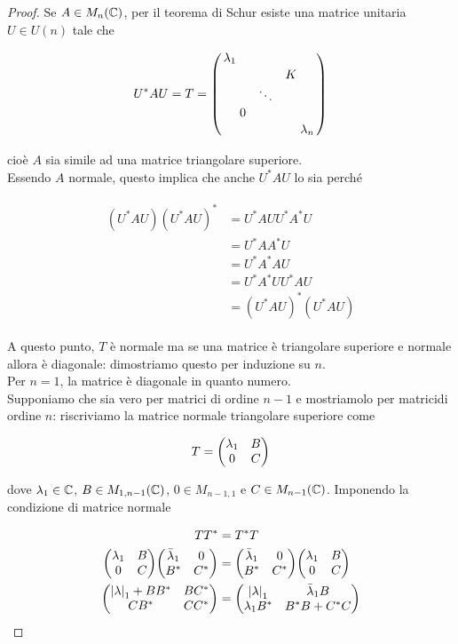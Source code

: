 \begin{proof}
	Se $ A \in M_{n}(\mathbb{C}) $, per il teorema di Schur esiste una matrice unitaria $ U \in U(n) $ tale che
	
	\begin{equation}
		U^{*} A U = T = %
		\smqty(\dmat{\lambda_{1}, & & K \\ & \ddots & \\ 0 & & ,\lambda_{n}})
	\end{equation}

	cioè $ A $ sia simile ad una matrice triangolare superiore.\\
	Essendo $ A $ normale, questo implica che anche $ U^{*} A U $ lo sia perché
	
	\begin{align}
		\begin{split}
			(U^{*} A U) (U^{*} A U)^{*} &= U^{*} A U U^{*} A^{*} U\\
			&= U^{*} A A^{*} U\\
			&= U^{*} A^{*} A U\\
			&= U^{*} A^{*} U U^{*} A U\\
			&= (U^{*} A U)^{*} (U^{*} A U)
		\end{split}
	\end{align}

	A questo punto, $ T $ è normale ma se una matrice è triangolare superiore e normale allora è diagonale: dimostriamo questo per induzione su $ n $.\\
	Per $ n=1 $, la matrice è diagonale in quanto numero.\\
	Supponiamo che sia vero per matrici di ordine $ n-1 $ e mostriamolo per matricidi ordine $ n $: riscriviamo la matrice normale triangolare superiore come
	
	\begin {equation}
		T = \mqty(\lambda_{1} & B \\ 0 & C)
	\end{equation}

	dove $ \lambda_{1} \in \mathbb{C} $, $ B \in M_{1,n-1}(\mathbb{C}) $, $ 0 \in M_{n-1,1} $ e $ C \in M_{n-1}(\mathbb{C}) $. Imponendo la condizione di matrice normale
	
	\begin{align}
		\begin{split}
			T T^{*} &= T^{*} T\\
			\mqty(\lambda_{1} & B \\ 0 & C) \mqty(\bar{\lambda}_{1} & 0 \\ B^{*} & C^{*}) &= \mqty(\bar{\lambda}_{1} & 0 \\ B^{*} & C^{*}) \mqty(\lambda_{1} & B \\ 0 & C)\\
			\mqty(\abs{\lambda}_{1} + B B^{*} & B C^{*} \\ C B^{*} & C C^{*}) &= \mqty(\abs{\lambda}_{1} & \bar{\lambda}_{1} B \\ \lambda_{1} B^{*} & B^{*} B + C^{*} C)
		\end{split}
	\end{align}


\end{proof}
